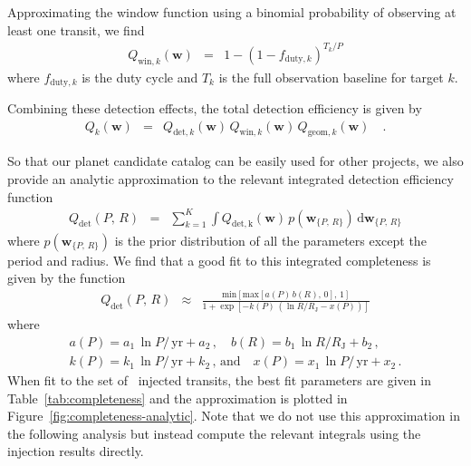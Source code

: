 \documentclass[manuscript, letterpaper]{aastex6}
\newcommand{\dfmfigref}[1]{\ref{fig:#1}}
\newcommand{\dfmFig}[1]{Figure~\dfmfigref{#1}}
\newcommand{\dfmfig}[1]{\dfmFig{#1}}
\newcommand{\dd}{\ensuremath{\,\mathrm{d}}}
\newcommand{\unit}[1]{{\ensuremath{\,\mathrm{#1}}}}
\newcommand{\bvec}[1]{{\ensuremath{\boldsymbol{#1}}}}
\newcommand{\params}{{\ensuremath{\bvec{w}}}}
\begin{document}
Approximating the window function using a binomial probability of observing
at least one transit, we find \citep[following][]{Burke:2014a}
\begin{eqnarray}
Q_{\mathrm{win},k} (\params) &=& 1 - (1 - f_{\mathrm{duty},k})^{T_k/P}
\end{eqnarray}
where $f_{\mathrm{duty},k}$ is the duty cycle and $T_k$ is the full
observation baseline for target $k$.

Combining these detection effects, the total detection efficiency is given by
\begin{eqnarray}
Q_k(\params) &=& Q_{\mathrm{det},k}(\params) \,
                 Q_{\mathrm{win},k} (\params) \,
                 Q_{\mathrm{geom},k} (\params) \quad.
\end{eqnarray}

So that our planet candidate catalog can be easily used for other projects, we
also provide an analytic approximation to the relevant integrated detection
efficiency function
\begin{eqnarray}
Q_\mathrm{det}(P,\,R) &=& \sum_{k=1}^{K} \int Q_\mathrm{det,k}(\params)\,
    p(\params_{\{P,\,R\}}) \dd\params_{\{P,\,R\}}
\end{eqnarray}
where $p(\params_{\{P,\,R\}})$ is the prior distribution of all the parameters
except the period and radius.
We find that a good fit to this integrated completeness is given by the
function
\begin{eqnarray}
Q_\mathrm{det}(P,\,R) &\approx&
    \frac{\mathrm{min}[\mathrm{max}[a(P)\,b(R),\,0],\,1]}
         {1+\exp\left[-k(P)\,(\ln R / R_\mathrm{J}-x(P))\right]}
\end{eqnarray}
where
\begin{eqnarray}
a(P) = a_1\,\ln P / \unit{yr} + a_2 \,,\quad
b(R) = b_1\,\ln R / R_\mathrm{J} + b_2 \,,\quad \\
k(P) = k_1\,\ln P / \unit{yr} + k_2 \,,\,\mathrm{and}\quad
x(P) = x_1\,\ln P / \unit{yr} + x_2 \,.
\end{eqnarray}
When fit to the set of \numinjs\ injected transits, the best fit parameters
are given in Table~\ref{tab:completeness} and the approximation is plotted
in \dfmfig{completeness-analytic}.
Note that we do not use this approximation in the following analysis but
instead compute the relevant integrals using the injection results directly.
\end{document}
